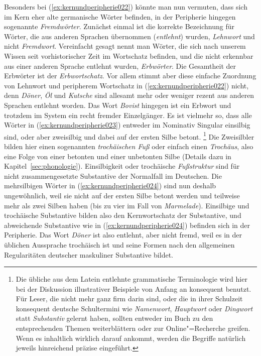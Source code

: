 Besonders bei (\ref{ex:kernundperipherie022}) könnte man nun vermuten, dass sich im Kern eher alte germanische Wörter befinden, in der Peripherie hingegen sogenannte \textit{Fremdwörter}.
Zunächst einmal ist die korrekte Bezeichnung für Wörter, die aus anderen Sprachen übernommen (\textit{entlehnt}) wurden, \textit{Lehnwort} und nicht \textit{Fremdwort}.
Vereinfacht gesagt nennt man Wörter, die sich nach unserem Wissen seit vorhistorischer Zeit im Wortschatz befinden, und die nicht erkennbar aus einer anderen Sprache entlehnt wurden, \textit{Erbwörter}.
Die Gesamtheit der Erbwörter ist der \textit{Erbwortschatz}.\label{abs:kernundperipherie031}
Vor allem stimmt aber diese einfache Zuordnung von Lehnwort und peripherem Wortschatz in (\ref{ex:kernundperipherie022}) nicht, denn \textit{Döner}, \textit{Öl} und \textit{Kutsche} sind allesamt mehr oder weniger rezent aus anderen Sprachen entlehnt worden.
Das Wort \textit{Bovist} hingegen ist ein Erbwort und trotzdem im System ein recht fremder Einzelgänger.
Es ist vielmehr so, dass alle Wörter in (\ref{ex:kernundperipherie023}) entweder im Nominativ Singular einsilbig sind, oder aber zweisilbig und dabei auf der ersten Silbe betont.%
\footnote{Die übliche aus dem Latein entlehnte grammatische Terminologie wird hier bei der Diskussion illustrativer Beispiele von Anfang an konsequent benutzt.
Für Leser, die nicht mehr ganz firm darin sind, oder die in ihrer Schulzeit konsequent deutsche Schultermini wie \zB \textit{Namenwort}, \textit{Hauptwort} oder \textit{Dingwort} statt \textit{Substantiv} gelernt haben, sollten entweder im Buch zu den entsprechenden Themen weiterblättern oder zur Online"=Recherche greifen.
Wenn es inhaltlich wirklich darauf ankommt, werden die Begriffe natürlich jeweils hinreichend präzise eingeführt.}
Die Zweisilbler bilden hier einen sogenannten \textit{trochäischen Fuß} oder einfach einen \textit{Trochäus}, also eine Folge von einer betonten und einer unbetonten Silbe (Details dazu in Kapitel~\ref{sec:phonologie}).
Einsilbigkeit oder trochäische \textit{Fußstruktur} sind für nicht zusammengesetzte Substantive der Normalfall im Deutschen.
Die mehrsilbigen Wörter in (\ref{ex:kernundperipherie024}) sind nun deshalb ungewöhnlich, weil sie nicht auf der ersten Silbe betont werden und teilweise mehr als zwei Silben haben (bis zu vier im Fall von \textit{Marmelade}).
Einsilbige und trochäische Substantive bilden also den Kernwortschatz der Substantive, und abweichende Substantive wie in (\ref{ex:kernundperipherie024}) befinden sich in der Peripherie.
Das Wort \textit{Döner} ist also entlehnt, aber nicht fremd, weil es in der üblichen Aussprache trochäisch ist und seine Formen nach den allgemeinen Regularitäten deutscher maskuliner Substantive bildet.
